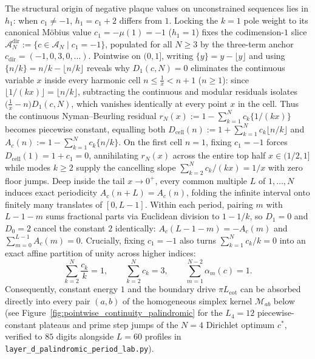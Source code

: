 \documentclass[10pt,a4paper]{article}
\theoremstyle{definition}
\begin{document}
The structural origin of negative plaque values on unconstrained sequences lies in $h_1$: when $c_1 \neq -1$, $h_1 = c_1 + 2$ differs from $1$. Locking the $k=1$ pole weight to its canonical M\"obius value $c_1 = -\mu(1) = -1$ ($h_1 = 1$) fixes the codimension-$1$ slice $\mathcal{A}_N^{\mathrm{dir}} := \{c \in \mathcal{A}_N \mid c_1 = -1\}$, populated for all $N \ge 3$ by the three-term anchor $c_{\mathrm{dir}} = (-1, 0, 3, 0, \dots)$. Pointwise on $(0,1]$, writing $\{y\} = y - \lfloor y \rfloor$ and using $\{n/k\} = n/k - \lfloor n/k \rfloor$ reveals why $D_1(c,N) = 0$ eliminates the continuous variable $x$ inside every harmonic cell $n \le \tfrac{1}{x} < n+1$ ($n \ge 1$): since $\lfloor 1/(kx) \rfloor = \lfloor n/k \rfloor$, subtracting the continuous and modular residuals isolates $\bigl(\tfrac{1}{x} - n\bigr)D_1(c,N)$, which vanishes identically at every point $x$ in the cell. Thus the continuous Nyman--Beurling residual $r_N(x) := 1 - \sum_{k=1}^N c_k \{1/(kx)\}$ becomes piecewise constant, equalling both $D_{\mathrm{cell}}(n) := 1 + \sum_{k=1}^N c_k \lfloor n/k \rfloor$ and $A_c(n) := 1 - \sum_{k=1}^N c_k \{n/k\}$. On the first cell $n=1$, fixing $c_1 = -1$ forces $D_{\mathrm{cell}}(1) = 1 + c_1 = 0$, annihilating $r_N(x)$ across the entire top half $x \in (1/2, 1]$ while modes $k \ge 2$ supply the cancelling slope $\sum_{k=2}^N c_k/(kx) = 1/x$ with zero floor jumps. Deep inside the tail $x \to 0^+$, every common multiple $L$ of $1,\dots,N$ induces exact periodicity $A_c(n+L) = A_c(n)$, folding the infinite interval onto finitely many translates of $[0, L-1]$. Within each period, pairing $m$ with $L - 1 - m$ sums fractional parts via Euclidean division to $1 - 1/k$, so $D_1 = 0$ and $D_0 = 2$ cancel the constant $2$ identically: $A_c(L - 1 - m) = -A_c(m)$ and $\sum_{m=0}^{L-1} A_c(m) = 0$. Crucially, fixing $c_1 = -1$ also turns $\sum_{k=1}^N c_k / k = 0$ into an exact affine partition of unity across higher indices:
\[
\sum_{k=2}^N \frac{c_k}{k} = 1, \qquad \sum_{k=2}^N c_k = 3, \qquad \sum_{m=1}^{N-2} \alpha_m(c) = 1.
\]
Consequently, constant energy $1$ and the boundary drive $\pi L_{\mathrm{cot}}$ can be absorbed directly into every pair $(a,b)$ of the homogeneous simplex kernel $\mathcal{M}_{ab}$ below (see Figure~\ref{fig:pointwise_continuity_palindromic} for the $L_4 = 12$ piecewise-constant plateaus and prime step jumps of the $N=4$ Dirichlet optimum $c^*$, verified to $85$ digits alongside $L=60$ profiles in \texttt{layer\_d\_\allowbreak palindromic\_\allowbreak period\_\allowbreak lab.py}).
\end{document}
